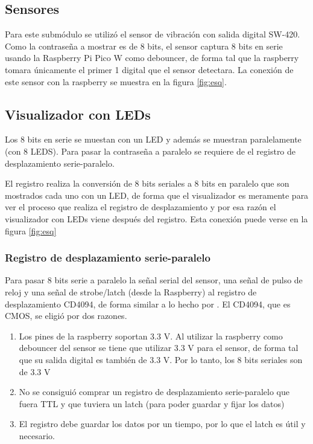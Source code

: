 \documentclass[conference]{IEEEtran}  %
\begin{document}
\subsection{Sensores}

Para este submódulo se utilizó el sensor de vibración con salida digital SW-420. Como la contraseña a mostrar es de 8 bits, el sensor captura 8 bits en serie usando la Raspberry Pi Pico W como debouncer, de forma tal que la raspberry tomara únicamente el primer 1 digital que el sensor detectara. La conexión de este sensor con la raspberry se muestra en la figura \ref{fig:esq}.

\subsection{Visualizador con LEDs}

Los 8 bits en serie se muestan con un LED y además se muestran paralelamente (con 8 LEDS). Para pasar la contraseña a paralelo se requiere de el registro de desplazamiento serie-paralelo.  

El registro realiza la conversión de 8 bits seriales a 8 bits en paralelo que son mostrados cada uno con un LED, de forma que el visualizador es meramente para ver el proceso que realiza el registro de desplazamiento y por esa razón el visualizador con LEDs viene después del registro. Esta conexión puede verse en la figura \ref{fig:esq}

\subsubsection{Registro de desplazamiento serie-paralelo}

Para pasar 8 bits serie a paralelo la señal serial del sensor, una señal de pulso de reloj y una señal de strobe/latch (desde la Raspberry) al registro de desplazamiento CD4094, de forma similar a lo hecho por \cite{micropython2025registro}. El CD4094, que es CMOS, se eligió por dos razones. 

\begin{enumerate}
    \item Los pines de la raspberry soportan 3.3 V. Al utilizar la raspberry como debouncer del sensor se tiene que utilizar 3.3 V para el sensor, de forma tal que su salida digital es también de 3.3 V. Por lo tanto, los 8 bits seriales son de 3.3 V
    \item No se consiguió comprar un registro de desplazamiento serie-paralelo que fuera TTL y que tuviera un latch (para poder guardar y fijar los datos)
    \item El registro debe guardar los datos por un tiempo, por lo que el latch es útil y necesario.
\end{enumerate}
\end{document}
